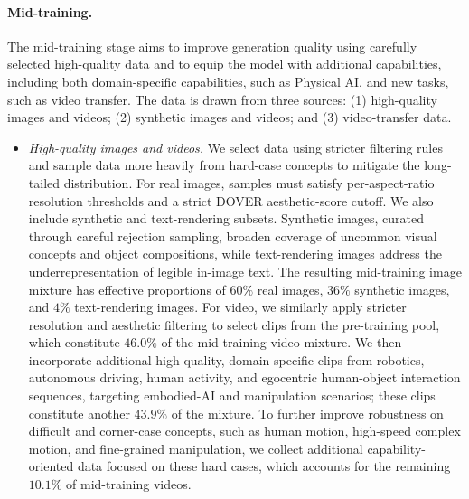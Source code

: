 \paragraph{Mid-training.} The mid-training stage aims to improve generation quality using carefully selected high-quality data and to equip the model with additional capabilities, including both domain-specific capabilities, such as Physical AI, and new tasks, such as video transfer. The data is drawn from three sources: (1) high-quality images and videos; (2) synthetic images and videos; and (3) video-transfer data.

\begin{itemize}
\item \textit{High-quality images and videos.} We select data using stricter filtering rules and sample data more heavily from hard-case concepts to mitigate the long-tailed distribution. For real images, samples must satisfy per-aspect-ratio resolution thresholds and a strict DOVER aesthetic-score cutoff. We also include synthetic and text-rendering subsets. Synthetic images, curated through careful rejection sampling, broaden coverage of uncommon visual concepts and object compositions, while text-rendering images address the underrepresentation of legible in-image text. The resulting mid-training image mixture has effective proportions of $60\%$ real images, $36\%$ synthetic images, and $4\%$ text-rendering images. For video, we similarly apply stricter resolution and aesthetic filtering to select clips from the pre-training pool, which constitute $46.0\%$ of the mid-training video mixture. We then incorporate additional high-quality, domain-specific clips from robotics, autonomous driving, human activity, and egocentric human-object interaction sequences, targeting embodied-AI and manipulation scenarios; these clips constitute another $43.9\%$ of the mixture. To further improve robustness on difficult and corner-case concepts, such as human motion, high-speed complex motion, and fine-grained manipulation, we collect additional capability-oriented data focused on these hard cases, which accounts for the remaining $10.1\%$ of mid-training videos.


\end{itemize}
